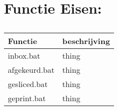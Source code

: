 \documentclass{article}
\begin{document}
\section*{\hspace{-1cm}Functie Eisen:}
\begin{table}[H]
    \centering
    \begin{tabular}%
    {>{\raggedright\arraybackslash}p{}%
    |>{\raggedright\arraybackslash}p{}}
    \rowcolor{myblue}
    Functie & beschrijving\\\hline
    inbox.bat & thing \\
    afgekeurd.bat & thing \\
    gesliced.bat & thing \\
    geprint.bat & thing \\
    \end{tabular}
    \caption*{}%
    \label{}
\end{table}
\end{document}
